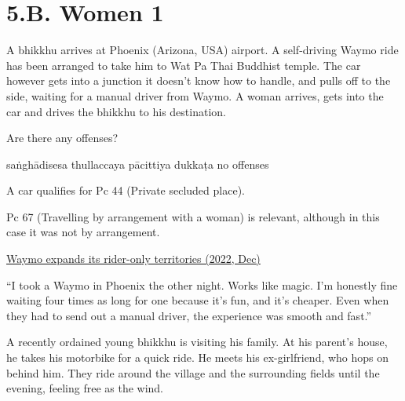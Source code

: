 \chapter{5.B. Women 1}
\renewcommand*{\theChapterTitle}{5.B. Women 1}

\begin{exam}{\autoExamName}

\begin{problem}

  A bhikkhu arrives at Phoenix (Arizona, USA) airport. A self-driving Waymo ride
  has been arranged to take him to Wat Pa Thai Buddhist temple. The car however
  gets into a junction it doesn't know how to handle, and pulls off to the side,
  waiting for a manual driver from Waymo. A woman arrives, gets into the car and
  drives the bhikkhu to his destination.

  Are there any offenses?

  \bigskip

  \begin{answers}{5}
    \bChoices
     saṅghādisesa\eAns
     thullaccaya\eAns
     pācittiya\eAns
     dukkaṭa\eAns
     no offenses\eAns
    \eChoices
  \end{answers}

  \begin{solution}
    A car qualifies for Pc 44 (Private secluded place).

    Pc 67 (Travelling by arrangement with a woman) is relevant, although in this case it was not by arrangement.

    \href{https://news.ycombinator.com/item?id=34038562}{Waymo expands its rider-only territories (2022, Dec)}

    ``I took a Waymo in Phoenix the other night. Works like magic. I’m honestly
    fine waiting four times as long for one because it’s fun, and it’s cheaper.
    Even when they had to send out a manual driver, the experience was smooth
    and fast.''
  \end{solution}

\end{problem}

\problemDivide

\begin{problem}

  A recently ordained young bhikkhu is visiting his family. At his parent's
  house, he takes his motorbike for a quick ride. He meets his ex-girlfriend,
  who hops on behind him. They ride around the village and the surrounding
  fields until the evening, feeling free as the wind.


\end{problem}
\end{exam}
